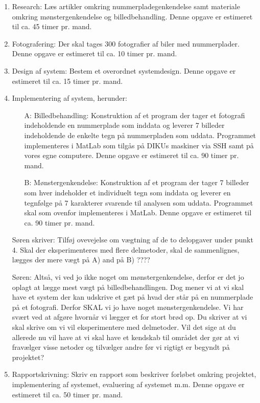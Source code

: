 \documentclass[10pt,a4paper,final]{report}
\begin{document}
\begin{enumerate}
\item Research: Læs artikler omkring nummerpladegenkendelse samt materiale omkring mønstergenkendelse og billedbehandling. Denne opgave er estimeret til ca. 45 timer pr. mand.

\item Fotografering: Der skal tages 300 fotografier af biler med nummerplader. Denne opgave er estimeret til ca. 10 timer pr. mand.

\item Design af system: Bestem et overordnet systemdesign. Denne opgave er estimeret til ca. 15 timer pr. mand.

\item Implementering af system, herunder:

\begin{itemize}
\item[A:] Billedbehandling: Konstruktion af et program der tager et fotografi indeholdende en nummerplade som inddata og leverer 7 billeder indeholdende de enkelte tegn på nummerpladen som uddata. Programmet implementeres i MatLab som tilgås på DIKUs maskiner via SSH samt på vores egne computere. Denne opgave er estimeret til ca. 90 timer pr. mand.

\item[B:] Mønstergenkendelse: Konstruktion af et program der tager 7 billeder som hver indeholder et individuelt tegn som inddata og leverer en tegnfølge på 7 karakterer svarende til analysen som uddata. Programmet skal som ovenfor implementeres i MatLab. Denne opgave er estimeret til ca. 90 timer pr. mand.

\end{itemize}

Søren skriver: Tilføj ovevejelse om vægtning af de to delopgaver under punkt 4. Skal der eksperimenteres med flere delmetoder, skal de sammenlignes, lægges der mere vægt på A) and på B) ????

Søren: Altså, vi ved jo ikke noget om mønstergenkendelse, derfor er det jo oplagt at lægge mest vægt på billedbehandlingen. Dog mener vi at vi skal have et system der kan udskrive et gæt på hvad der står på en nummerplade på et fotografi. Derfor SKAL vi jo have noget mønstergenkendelse. Vi har svært ved at afgøre hvornår vi lægger et for stort brød op. Du skriver at vi skal skrive om vi vil eksperimentere med delmetoder. Vil det sige at du allerede nu vil have at vi skal have et kendskab til området der gør at vi fravælger visse netoder og tilvælger andre før vi rigtigt er begyndt på projektet?


\item Rapportskrivning: Skriv en rapport som beskriver forløbet omkring projektet, implementering af systemet, evaluering af systemet m.m. Denne opgave er estimeret til ca. 50 timer pr. mand.


\end{enumerate}
\end{document}
